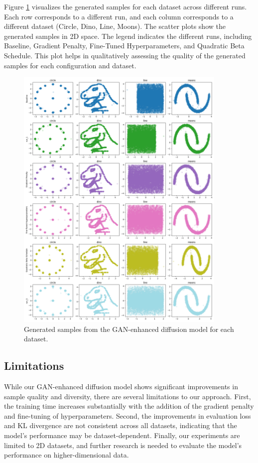 \documentclass{article} %
\begin{document}
Figure \ref{fig:generated_samples} visualizes the generated samples for each dataset across different runs. Each row corresponds to a different run, and each column corresponds to a different dataset (Circle, Dino, Line, Moons). The scatter plots show the generated samples in 2D space. The legend indicates the different runs, including Baseline, Gradient Penalty, Fine-Tuned Hyperparameters, and Quadratic Beta Schedule. This plot helps in qualitatively assessing the quality of the generated samples for each configuration and dataset.

\begin{figure}[h]
    \centering
    \includegraphics[width=0.9\textwidth]{generated_images.png}
    \caption{Generated samples from the GAN-enhanced diffusion model for each dataset.}
    \label{fig:generated_samples}
\end{figure}

\subsection{Limitations}
While our GAN-enhanced diffusion model shows significant improvements in sample quality and diversity, there are several limitations to our approach. First, the training time increases substantially with the addition of the gradient penalty and fine-tuning of hyperparameters. Second, the improvements in evaluation loss and KL divergence are not consistent across all datasets, indicating that the model's performance may be dataset-dependent. Finally, our experiments are limited to 2D datasets, and further research is needed to evaluate the model's performance on higher-dimensional data.
\end{document}
